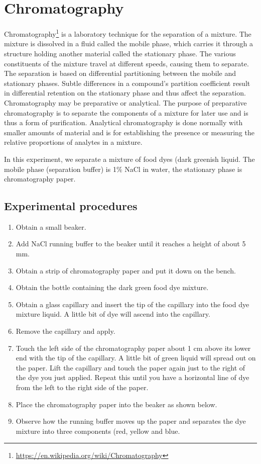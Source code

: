 \documentclass[]{book}
\providecommand{\tightlist}{%
  \setlength{\itemsep}{0pt}\setlength{\parskip}{0pt}}
\let\rmarkdownfootnote\footnote%
\def\footnote{\protect\rmarkdownfootnote}
\renewcommand{\href}[2]{#2\footnote{\url{#1}}}
\theoremstyle{definition}
\theoremstyle{definition}
\theoremstyle{definition}
\theoremstyle{remark}
\begin{document}
\section{Chromatography}\label{chromatography}

\href{https://en.wikipedia.org/wiki/Chromatography}{Chromatography} is a
laboratory technique for the separation of a mixture. The mixture is
dissolved in a fluid called the mobile phase, which carries it through a
structure holding another material called the stationary phase. The
various constituents of the mixture travel at different speeds, causing
them to separate. The separation is based on differential partitioning
between the mobile and stationary phases. Subtle differences in a
compound's partition coefficient result in differential retention on the
stationary phase and thus affect the separation. Chromatography may be
preparative or analytical. The purpose of preparative chromatography is
to separate the components of a mixture for later use and is thus a form
of purification. Analytical chromatography is done normally with smaller
amounts of material and is for establishing the presence or measuring
the relative proportions of analytes in a mixture.

In this experiment, we separate a mixture of food dyes (dark greenish
liquid. The mobile phase (separation buffer) is 1\% NaCl in water, the
stationary phase is chromatography paper.

\subsection{Experimental procedures}\label{experimental-procedures-27}

\begin{enumerate}
\def\labelenumi{\arabic{enumi}.}
\tightlist
\item
  Obtain a small beaker.
\item
  Add NaCl running buffer to the beaker until it reaches a height of
  about 5 mm.
\item
  Obtain a strip of chromatography paper and put it down on the bench.
\item
  Obtain the bottle containing the dark green food dye mixture.
\item
  Obtain a glass capillary and insert the tip of the capillary into the
  food dye mixture liquid. A little bit of dye will ascend into the
  capillary.
\item
  Remove the capillary and apply.
\item
  Touch the left side of the chromatography paper about 1 cm above its
  lower end with the tip of the capillary. A little bit of green liquid
  will spread out on the paper. Lift the capillary and touch the paper
  again just to the right of the dye you just applied. Repeat this until
  you have a horizontal line of dye from the left to the right side of
  the paper.
\item
  Place the chromatography paper into the beaker as shown below.
\item
  Observe how the running buffer moves up the paper and separates the
  dye mixture into three components (red, yellow and blue.
\end{enumerate}
\end{document}
